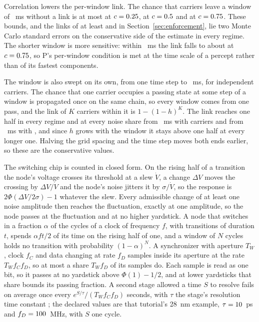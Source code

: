 \documentclass[12pt]{article}
\begin{document}
Correlation lowers the per-window link. The chance that \uOccCarriersMid{}
carriers leave a window of \uOccContentLongMs{}~ms without a link is at most
\uCorMissA{} at $c=0.25$, \uCorMissB{} at $c=0.5$ and
\uCorMissC{} at $c=0.75$. These bounds, and the links of at least
\uCorLinkMidTol{} and \uCorLinkManyTol{} in Section~\ref{sec:enforcement}, lie
two Monte Carlo standard errors on the conservative side of the estimate in
every regime. The shorter window is more sensitive: within
\uOccContentShortMs{}~ms the link falls to about \uCorLinkShortTol{} at
$c=0.75$, so P's per-window condition is met at the time scale of a
percept rather than of its fastest components.

The window is also swept on its own, from one time step to \uWinLongestMs{}~ms,
for independent carriers. The chance that one carrier occupies a passing state
at some step of a window is propagated once on the same chain, so every window
comes from one pass, and the link of $K$ carriers within it is
$1-(1-h)^K$. The link reaches one half in every regime and at every noise share
from \uWinLowManyMs{}~ms with \uOccCarriersMany{} carriers and from
\uWinLowMidMs{}~ms with \uOccCarriersMid{}, and since $h$ grows with the
window it stays above one half at every longer one. Halving the grid spacing and
the time step moves both ends earlier, so these are the conservative values.

The switching chip is counted in closed form. On the rising half of a
transition the node's voltage crosses its threshold at a slew $\dot V$, a change
$\Delta V$ moves the crossing by $\Delta V/\dot V$ and the node's noise jitters
it by $\sigma/\dot V$, so the response is $2\Phi(\Delta V/2\sigma)-1$ whatever
the slew. Every admissible change of at least one noise amplitude then reaches
the fluctuation, exactly at one amplitude, so the node passes at the
fluctuation and at no higher yardstick. A node that switches in a fraction
$\alpha$ of the cycles of a clock of frequency $f$, with transitions of
duration $t$, spends $\alpha f t/2$ of its time on the rising half of one, and a
window of $N$ cycles holds no transition with probability $(1-\alpha)^N$. A
synchronizer with aperture $T_W$, clock $f_C$ and data changing at rate $f_D$
samples inside its aperture at the rate $T_W f_C f_D$, so at most a share $T_W
f_D$ of its samples do. Each sample is read as one bit, so it passes at no
yardstick above $\Phi(1)-1/2$, and at lower yardsticks that share bounds its
passing fraction. A second stage allowed a time $S$ to resolve fails
on average once every $e^{S/\tau}/(T_W f_C f_D)$ seconds, with $\tau$ the stage's
resolution time constant \citep{ginosar2011}; the declared values are that
tutorial's 28~nm example, $\tau=10$~ps and $f_D=100$~MHz, with
$S$ one cycle.
\end{document}
